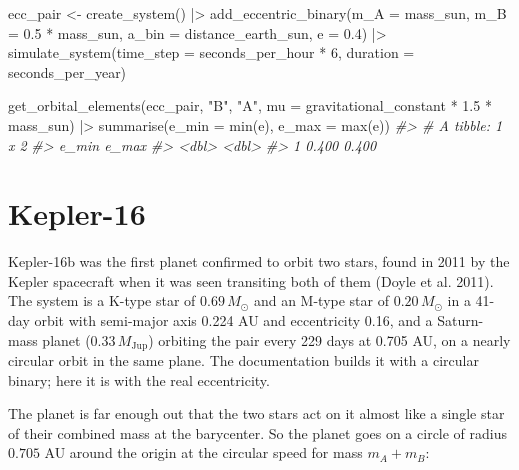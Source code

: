 \documentclass[
  10.5pt,
  letterpaper,
]{scrbook}
\newenvironment{Shaded}{\begin{snugshade}}{\end{snugshade}}
\newcommand{\AttributeTok}[1]{\textcolor[rgb]{0.00,0.00,0.00}{#1}}
\newcommand{\CommentTok}[1]{\textcolor[rgb]{0.00,0.00,0.00}{\textit{#1}}}
\newcommand{\DecValTok}[1]{\textcolor[rgb]{0.00,0.00,0.00}{#1}}
\newcommand{\FloatTok}[1]{\textcolor[rgb]{0.00,0.00,0.00}{#1}}
\newcommand{\FunctionTok}[1]{\textcolor[rgb]{0.00,0.00,0.00}{#1}}
\newcommand{\NormalTok}[1]{\textcolor[rgb]{0.00,0.00,0.00}{#1}}
\newcommand{\OtherTok}[1]{\textcolor[rgb]{0.00,0.00,0.00}{#1}}
\newcommand{\SpecialCharTok}[1]{\textcolor[rgb]{0.00,0.00,0.00}{#1}}
\newcommand{\StringTok}[1]{\textcolor[rgb]{0.00,0.00,0.00}{#1}}
\theoremstyle{plain}
\theoremstyle{remark}
\begin{document}
\begin{Shaded}
\begin{Highlighting}[]
\NormalTok{ecc\_pair }\OtherTok{\textless{}{-}} \FunctionTok{create\_system}\NormalTok{() }\SpecialCharTok{|\textgreater{}}
  \FunctionTok{add\_eccentric\_binary}\NormalTok{(}\AttributeTok{m\_A =}\NormalTok{ mass\_sun, }\AttributeTok{m\_B =} \FloatTok{0.5} \SpecialCharTok{*}\NormalTok{ mass\_sun,}
                       \AttributeTok{a\_bin =}\NormalTok{ distance\_earth\_sun, }\AttributeTok{e =} \FloatTok{0.4}\NormalTok{) }\SpecialCharTok{|\textgreater{}}
  \FunctionTok{simulate\_system}\NormalTok{(}\AttributeTok{time\_step =}\NormalTok{ seconds\_per\_hour }\SpecialCharTok{*} \DecValTok{6}\NormalTok{, }\AttributeTok{duration =}\NormalTok{ seconds\_per\_year)}

\FunctionTok{get\_orbital\_elements}\NormalTok{(ecc\_pair, }\StringTok{"B"}\NormalTok{, }\StringTok{"A"}\NormalTok{, }\AttributeTok{mu =}\NormalTok{ gravitational\_constant }\SpecialCharTok{*} \FloatTok{1.5} \SpecialCharTok{*}\NormalTok{ mass\_sun) }\SpecialCharTok{|\textgreater{}}
  \FunctionTok{summarise}\NormalTok{(}\AttributeTok{e\_min =} \FunctionTok{min}\NormalTok{(e), }\AttributeTok{e\_max =} \FunctionTok{max}\NormalTok{(e))}
\CommentTok{\#\textgreater{} \# A tibble: 1 x 2}
\CommentTok{\#\textgreater{}   e\_min e\_max}
\CommentTok{\#\textgreater{}   \textless{}dbl\textgreater{} \textless{}dbl\textgreater{}}
\CommentTok{\#\textgreater{} 1 0.400 0.400}
\end{Highlighting}
\end{Shaded}

\section{Kepler-16}\label{kepler-16}

Kepler-16b was the first planet confirmed to orbit two stars, found in
2011 by the Kepler spacecraft when it was seen transiting both of them
({Doyle et al.} 2011). The system is a K-type star of \(0.69\,M_\odot\)
and an M-type star of \(0.20\,M_\odot\) in a 41-day orbit with
semi-major axis 0.224 AU and eccentricity 0.16, and a Saturn-mass planet
(\(0.33\,M_{\mathrm{Jup}}\)) orbiting the pair every 229 days at 0.705
AU, on a nearly circular orbit in the same plane. The documentation
builds it with a circular binary; here it is with the real eccentricity.

The planet is far enough out that the two stars act on it almost like a
single star of their combined mass at the barycenter. So the planet goes
on a circle of radius \(0.705\) AU around the origin at the circular
speed for mass \(m_A + m_B\):
\end{document}
